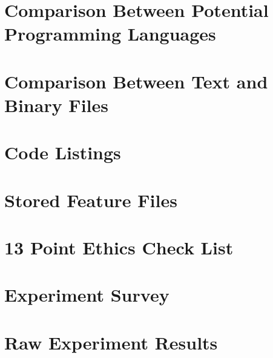 \documentclass[11pt,openright,twoside,a4paper]{report}
\begin{document}
\chapter{Comparison Between Potential Programming Languages}
\label{ch:appendix-comparison-programming-languages}


\chapter{Comparison Between Text and Binary Files}
\label{ch:appendix-comparison-text-vs-binary}


\chapter{Code Listings}
\label{ch:appendix-code-listings}


\chapter{Stored Feature Files}
\label{ch:appendix-stored-feature-files}


\chapter{13 Point Ethics Check List}
\label{ch:appendix-ethics-checklist}


\chapter{Experiment Survey}
\label{ch:appendix-experiment-survey}


\chapter{Raw Experiment Results}
\label{ch:appendix-survey-results}





\end{document}
